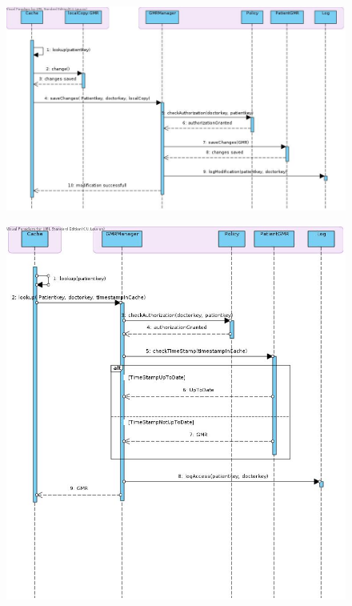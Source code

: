 \documentclass[a4paper,10pt]{book}
\begin{document}
\begin{center}
    \begin{figure}
      \includegraphics{../images/modifyGMR.jpg}
    \end{figure}
  \end{center}

\begin{center}
    \begin{figure}
      \includegraphics{../images/retrieveGMR.jpg}
    \end{figure}
  \end{center}
\end{document}

